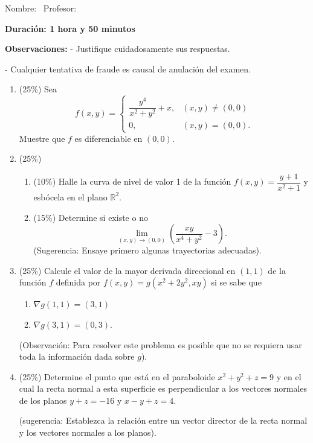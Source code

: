 \documentclass[11pt]{article}
\begin{document}
\examheader

\vspace{4pt}
\noindent Nombre: \dotfill\ Profesor: \dotfill

\begin{center}\textbf{Duración: 1 hora y 50 minutos}\end{center}

\noindent\textbf{Observaciones:} - Justifique cuidadosamente sus respuestas.

\hspace{2.3cm} - Cualquier tentativa de fraude es causal de anulación del examen.

\vspace{8pt}
\begin{enumerate}
\item{} (25\%) Sea
\[
f(x,y) = \left\{
\begin{array}{ll}
\dfrac{y^4}{x^2+y^2}+x, & (x,y)\neq(0,0)\\[6pt]
0, & (x,y)=(0,0).
\end{array}
\right.
\]
\noindent Muestre que $f$ es diferenciable en $(0,0)$.

\vspace{5cm}

\item{} (25\%)
\begin{enumerate}
\item{} (10\%) Halle la curva de nivel de valor 1 de la función $f(x,y)=\dfrac{y+1}{x^2+1}$ y esbócela en el plano $\mathbb{R}^2$.

\vspace{4cm}

\item{} (15\%) Determine si existe o no
\[
\lim_{(x,y)\to(0,0)}\left(\frac{xy}{x^4+y^2}-3\right).
\]
\noindent (Sugerencia: Ensaye primero algunas trayectorias adecuadas).

\vspace{4cm}
\end{enumerate}

\item{} (25\%) Calcule el valor de la mayor derivada direccional en $(1,1)$ de la función $f$ definida por $f(x,y)=g(x^2+2y^2,xy)$ si se sabe que
\begin{enumerate}
\item{} $\nabla g(1,1) = (3,1)$
\item{} $\nabla g(3,1) = (0,3)$.
\end{enumerate}
\noindent (Observación: Para resolver este problema es posible que no se requiera usar toda la información dada sobre $g$).

\vspace{6cm}

\item{} (25\%) Determine el punto que está en el paraboloide $x^2+y^2+z=9$ y en el cual la recta normal a esta superficie es perpendicular a los vectores normales de los planos $y+z=-16$ y $x-y+z=4$.

\noindent (sugerencia: Establezca la relación entre un vector director de la recta normal y los vectores normales a los planos).

\vspace{6cm}
\end{enumerate}

\examfooter
\end{document}
